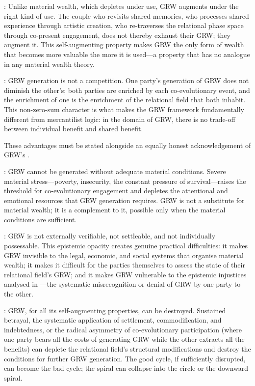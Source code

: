 : Unlike material wealth, which depletes under use, GRW augments under the right kind of use. The couple who revisits shared memories, who processes shared experience through artistic creation, who re-traverses the relational phase space through co-present engagement, does not thereby exhaust their GRW; they augment it. This self-augmenting property makes GRW the only form of wealth that becomes more valuable the more it is used---a property that has no analogue in any material wealth theory.

: GRW generation is not a competition. One party's generation of GRW does not diminish the other's; both parties are enriched by each co-evolutionary event, and the enrichment of one is the enrichment of the relational field that both inhabit. This non-zero-sum character is what makes the GRW framework fundamentally different from mercantilist logic: in the domain of GRW, there is no trade-off between individual benefit and shared benefit.

These advantages must be stated alongside an equally honest acknowledgement of GRW's .

: GRW cannot be generated without adequate material conditions. Severe material stress---poverty, insecurity, the constant pressure of survival---raises the threshold for co-evolutionary engagement and depletes the attentional and emotional resources that GRW generation requires. GRW is not a substitute for material wealth; it is a complement to it, possible only when the material conditions are sufficient.

: GRW is not externally verifiable, not settleable, and not individually possessable. This epistemic opacity creates genuine practical difficulties: it makes GRW invisible to the legal, economic, and social systems that organise material wealth; it makes it difficult for the parties themselves to assess the state of their relational field's GRW; and it makes GRW vulnerable to the epistemic injustices analysed in ---the systematic misrecognition or denial of GRW by one party to the other.

: GRW, for all its self-augmenting properties, can be destroyed. Sustained betrayal, the systematic application of settlement, commodification, and indebtedness, or the radical asymmetry of co-evolutionary participation (where one party bears all the costs of generating GRW while the other extracts all the benefits) can deplete the relational field's structural modifications and destroy the conditions for further GRW generation. The good cycle, if sufficiently disrupted, can become the bad cycle; the spiral can collapse into the circle or the downward spiral.


